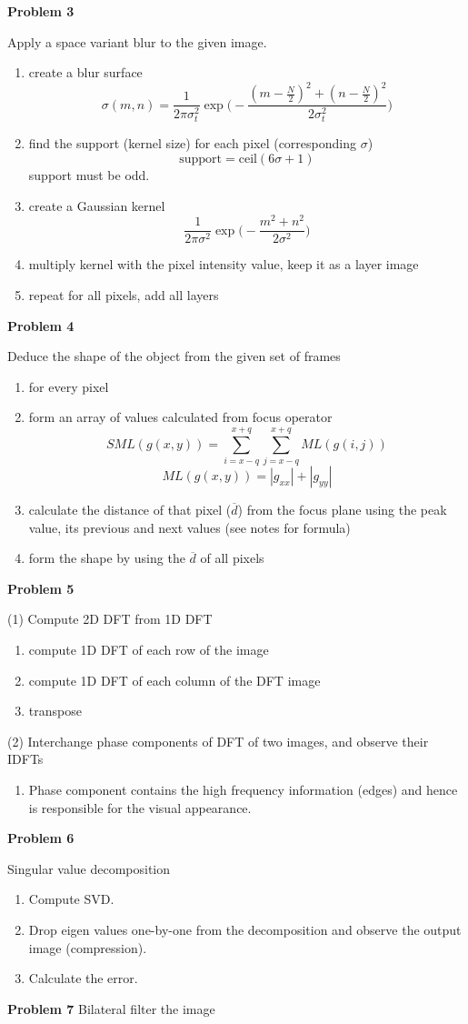 \documentclass[12pt]{article}
\begin{document}
\noindent
\textbf{Problem 3}

\noindent
Apply a space variant blur to the given image.
\begin{enumerate}
\item create a blur surface
\[\sigma(m,n) = 
\frac{1}{2 \pi \sigma_t^2} 
\exp{\bigg(-\frac{(m-\frac{N}{2})^2+(n-\frac{N}{2})^2}
{2 \sigma_t^2}\bigg)}\]
\item find the support (kernel size) for each pixel 
(corresponding \(\sigma\))
\[\text{support} = \text{ceil}(6 \sigma + 1)\] support must be odd.
\item create a Gaussian kernel
\[\frac{1}{2 \pi \sigma^2} 
\exp{\bigg(-\frac{m^2+n^2}{2 \sigma^2}\bigg)}\]
\item multiply kernel with the pixel intensity value, keep it as a 
layer image
\item repeat for all pixels, add all layers
\end{enumerate}

\noindent
\textbf{Problem 4}

Deduce the shape of the object from the given set of frames
\begin{enumerate}
\item for every pixel
\item form an array of values calculated from focus operator
\[SML(g(x,y)) = \sum_{i=x-q}^{x+q} \sum_{j=x-q}^{x+q} ML(g(i,j))\]
\[ML(g(x,y)) = |g_{xx}| + |g_{yy}| \]
\item calculate the distance of that pixel (\(\overline{d}\))
from the focus plane using
 the  peak value, its previous and next values (see notes for formula)
\item form the shape by using the \(\overline{d}\) of all pixels
\end{enumerate}

\noindent
\textbf{Problem 5}

\noindent
(1) Compute 2D DFT from 1D DFT
\begin{enumerate}
\item compute 1D DFT of each row of the image
\item compute 1D DFT of each column of the DFT image
\item transpose
\end{enumerate}

\noindent
(2) Interchange phase components of DFT of two images, and 
observe their IDFTs
\begin{enumerate}
\item Phase component contains the high frequency information 
(edges) and hence is responsible for the visual appearance.
\end{enumerate}

\noindent
\textbf{Problem 6}

\noindent
Singular value decomposition
\begin{enumerate}
\item Compute SVD.  
\item Drop eigen values one-by-one from the decomposition 
and observe the output image (compression).  
\item Calculate the error.
\end{enumerate}


\noindent
\textbf{Problem 7}
Bilateral filter the image
\end{document}
